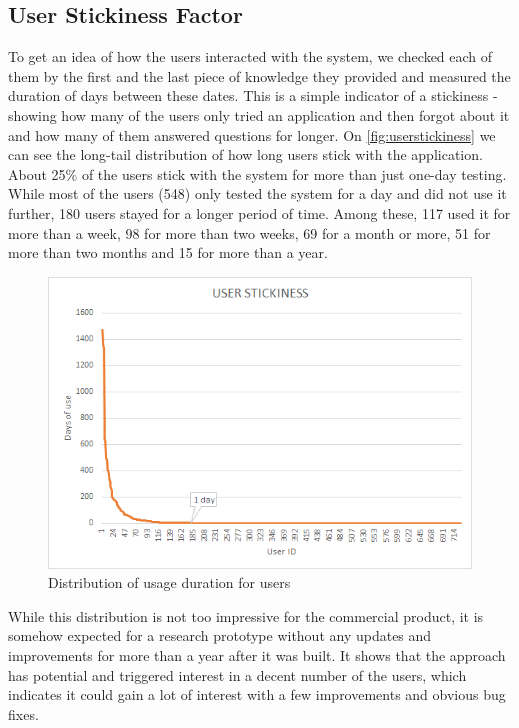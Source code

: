 {\subsection{User Stickiness Factor}
\label{section:stickiness}
To get an idea of how the users interacted with the system, we checked each of
them by the first and the last piece of knowledge they provided and measured 
the duration of days between these dates. This is a simple indicator of a 
stickiness - showing how many of the users only tried an application and then 
forgot about it and how many of them answered questions for longer. On
\autoref{fig:userstickiness} we can see the long-tail distribution of how long 
users stick with the application. About 25\% of the users stick with the 
system for more than just one-day testing. While most of the users (548) only 
tested the system for a day and did not use it further, 180 users stayed for a 
longer period of time. Among these, 117 used it for more than a week, 98 for 
more than two weeks, 69 for a month or more, 51 for more than two months and 
15 for more than a year.
\begin{figure}[H]
	\centering
		\includegraphics[width=1\textwidth]{figures/userStickiness.png}
	\caption{Distribution of usage duration for users}
	\label{fig:userstickiness}
\end{figure}

While this distribution is not too impressive for the commercial product, 
it is somehow expected for a research prototype without any updates and 
improvements for more than a year after it was built. It shows that the 
approach has potential and triggered interest in a decent number of the users, 
which indicates it could gain a lot of interest with a few improvements and 
obvious bug fixes.

}
